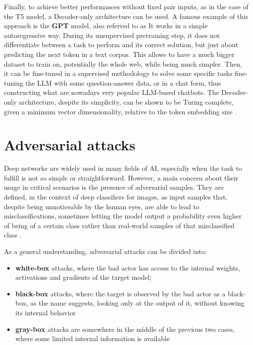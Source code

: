 \documentclass[../thesis.tex]{subfiles}
\begin{document}
Finally, to achieve better performances without fixed pair inputs, as in the case of the T5 model,
a Decoder-only architecture can be used. A famous example of this approach is the \textbf{GPT} model, also referred to as  It works in a simple autoregressive way. During its unsupervised pretraining step, it does not differentiate between a task to perform and its correct solution, but just about predicting the next token in a text corpus.
This allows to have a much bigger dataset to train on, potentially the whole web, while being much simpler. Then, it can be fine-tuned in a supervised methodology to solve some specific tasks fine-tuning the LLM with some question-answer data, or in a chat form, thus constructing what are nowadays very popular LLM-based chatbots.
The Decoder-only architecture, despite its simplicity, can be shown to be Turing complete, given a minimum vector dimensionality, relative to the token embedding size \citep{roberts2024powerful-decoderonly}.

\section{Adversarial attacks}
Deep networks are widely used in many fields of AI, especially when the task to fulfill is not so simple or straightforward.
However, a main concern about their usage in critical scenarios is the presence of adversarial samples.
They are defined, in the context of deep classifiers for images, as input samples that, despite being unnoticeable by the human eyes, are able to lead to misclassifications, sometimes letting the model output a probability even higher of being of a certain class rather than real-world samples of that misclassified class \citep{zhang2023review-adversarialattacksurvey}.

As a general understanding, adversarial attacks can be divided into:
\begin{itemize}
    \item \textbf{white-box} attacks, where the bad actor has access to the internal weights, activations and gradients of the target model;
    \item \textbf{black-box} attacks, where the target is observed by the bad actor as a black-box, as the name suggests, looking only at the output of it, without knowing its internal behavior
    \item \textbf{gray-box} attacks are somewhere in the middle of the previous two cases, where some limited internal information is available
\end{itemize}
\end{document}
